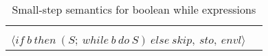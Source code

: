 \begin{table}[H]
    \centering
    \begin{longtable}[c] { r c }
    
    \begin{tabular}{@{}c@{}} 
    [WHILE] \\
    \newline
    \end{tabular} 
  \begin{tabular}{@{}c@{}}   \(
  \langle while \ b \ do \ S, \ sto, \ envl \rangle \Rightarrow
  \)  \\ \(
  \langle if \ b \ then \ (S; \ while \ b \ do \ S) \ else \ skip, \ sto, \ envl \rangle
  \) 
  \end{tabular}
        
 \end{longtable}
    \caption{Small-step semantics for boolean while expressions}\label{sem:while}
\end{table}